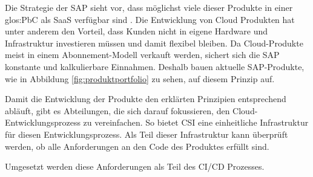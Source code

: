 \documentclass[../main.tex]{subfiles}
\begin{document}
Die Strategie der SAP sieht vor, dass möglichst viele dieser Produkte in einer \gls{glos:PbC} als \gls{SaaS} verfügbar sind \cite{SAPCloudStrategy}.
Die Entwicklung von Cloud Produkten hat unter anderem den Vorteil, dass Kunden nicht in eigene Hardware und Infrastruktur investieren müssen und damit flexibel bleiben.
Da Cloud-Produkte meist in einem Abonnement-Modell verkauft werden, sichert sich die SAP konstante und kalkulierbare Einnahmen.
Deshalb bauen aktuelle SAP-Produkte, wie in Abbildung \ref{fig:produktportfolio} zu sehen, auf diesem Prinzip auf.
\cite{CloudProContra}

Damit die Entwicklung der Produkte den erklärten Prinzipien entsprechend abläuft, gibt es Abteilungen, die sich darauf fokussieren, den Cloud-Entwicklungsprozess zu vereinfachen.
So bietet \gls{CSI} eine einheitliche Infrastruktur für diesen Entwicklungsprozess.
Als Teil dieser Infrastruktur kann überprüft werden, ob alle Anforderungen an den Code des Produktes erfüllt sind. 

Umgesetzt werden diese Anforderungen als Teil des \gls{CI/CD} Prozesses.
\end{document}
